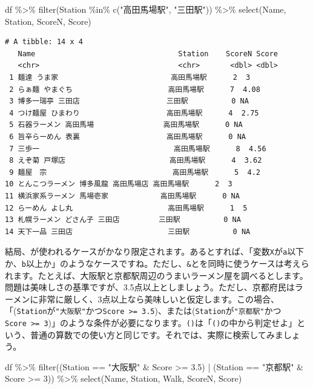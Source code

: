 \documentclass[
  a4paper,
  pandoc,
  ja=standard,
  jafont=haranoaji]{bxjsbook}
\newenvironment{Shaded}{\begin{snugshade}}{\end{snugshade}}
\newcommand{\DecValTok}[1]{\textcolor[rgb]{0.68,0.00,0.00}{#1}}
\newcommand{\FloatTok}[1]{\textcolor[rgb]{0.68,0.00,0.00}{#1}}
\newcommand{\FunctionTok}[1]{\textcolor[rgb]{0.28,0.35,0.67}{#1}}
\newcommand{\NormalTok}[1]{\textcolor[rgb]{0.00,0.48,0.65}{#1}}
\newcommand{\SpecialCharTok}[1]{\textcolor[rgb]{0.37,0.37,0.37}{#1}}
\newcommand{\StringTok}[1]{\textcolor[rgb]{0.13,0.47,0.30}{#1}}
\begin{document}
\begin{Shaded}
\begin{Highlighting}[numbers=left,,]
\NormalTok{df }\SpecialCharTok{\%\textgreater{}\%} 
  \FunctionTok{filter}\NormalTok{(Station }\SpecialCharTok{\%in\%} \FunctionTok{c}\NormalTok{(}\StringTok{"高田馬場駅"}\NormalTok{, }\StringTok{"三田駅"}\NormalTok{)) }\SpecialCharTok{\%\textgreater{}\%}
  \FunctionTok{select}\NormalTok{(Name, Station, ScoreN, Score)}
\end{Highlighting}
\end{Shaded}

\begin{verbatim}
# A tibble: 14 x 4
   Name                                 Station    ScoreN Score
   <chr>                                <chr>       <dbl> <dbl>
 1 麺達 うま家                          高田馬場駅      2  3   
 2 らぁ麺 やまぐち                      高田馬場駅      7  4.08
 3 博多一瑞亭 三田店                    三田駅          0 NA   
 4 つけ麺屋 ひまわり                    高田馬場駅      4  2.75
 5 石器ラーメン 高田馬場                高田馬場駅      0 NA   
 6 旨辛らーめん 表裏                    高田馬場駅      0 NA   
 7 三歩一                               高田馬場駅      8  4.56
 8 えぞ菊 戸塚店                        高田馬場駅      4  3.62
 9 麺屋　宗                             高田馬場駅      5  4.2 
10 とんこつラーメン 博多風龍 高田馬場店 高田馬場駅      2  3   
11 横浜家系ラーメン 馬場壱家            高田馬場駅      0 NA   
12 らーめん よし丸                      高田馬場駅      1  5   
13 札幌ラーメン どさん子 三田店         三田駅          0 NA   
14 天下一品 三田店                      三田駅          0 NA   
\end{verbatim}

結局、\texttt{\textbar{}}が使われるケースがかなり限定されます。あるとすれば、「変数\texttt{X}が\texttt{a}以下か、\texttt{b}以上か」のようなケースですね。ただし、\texttt{\&}と\texttt{\textbar{}}を同時に使うケースは考えられます。たとえば、大阪駅と京都駅周辺のうまいラーメン屋を調べるとします。問題は美味しさの基準ですが、3.5点以上としましょう。ただし、京都府民はラーメンに非常に厳しく、3点以上なら美味しいと仮定します。この場合、「(\texttt{Station}が\texttt{"大阪駅"}かつ\texttt{Score\ \textgreater{}=\ 3.5})、または(\texttt{Station}が\texttt{"京都駅"}かつ\texttt{Score\ \textgreater{}=\ 3})」のような条件が必要になります。\texttt{()}は「\texttt{()}の中から判定せよ」という、普通の算数での使い方と同じです。それでは、実際に検索してみましょう。

\begin{Shaded}
\begin{Highlighting}[numbers=left,,]
\NormalTok{df }\SpecialCharTok{\%\textgreater{}\%}
  \FunctionTok{filter}\NormalTok{((Station }\SpecialCharTok{==} \StringTok{"大阪駅"} \SpecialCharTok{\&}\NormalTok{ Score }\SpecialCharTok{\textgreater{}=} \FloatTok{3.5}\NormalTok{) }\SpecialCharTok{|}\NormalTok{ (Station }\SpecialCharTok{==} \StringTok{"京都駅"} \SpecialCharTok{\&}\NormalTok{ Score }\SpecialCharTok{\textgreater{}=} \DecValTok{3}\NormalTok{)) }\SpecialCharTok{\%\textgreater{}\%}
  \FunctionTok{select}\NormalTok{(Name, Station, Walk, ScoreN, Score)}
\end{Highlighting}
\end{Shaded}
\end{document}
